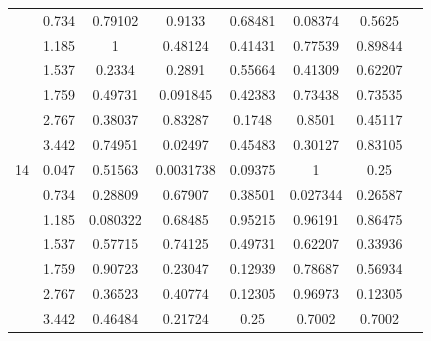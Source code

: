 \begin{table}[H]
\begin{center}
\begin{tabular}{cccccccc}
    &          0.734&          0.79102&          0.9133&          0.68481&          0.08374&          0.5625 \\
    &          1.185&          1&          0.48124&          0.41431&          0.77539&          0.89844 \\
    &          1.537&          0.2334&          0.2891&          0.55664&          0.41309&          0.62207 \\
    &          1.759&          0.49731&          0.091845&          0.42383&          0.73438&          0.73535 \\
    &          2.767&          0.38037&          0.83287&          0.1748&          0.8501&          0.45117 \\
    &          3.442&          0.74951&          0.02497&          0.45483&          0.30127&          0.83105 \\
  14&          0.047&          0.51563&          0.0031738&          0.09375&          1&          0.25 \\
    &          0.734&          0.28809&          0.67907&          0.38501&          0.027344&          0.26587 \\
    &          1.185&          0.080322&          0.68485&          0.95215&          0.96191&          0.86475 \\
    &          1.537&          0.57715&          0.74125&          0.49731&          0.62207&          0.33936 \\
    &          1.759&          0.90723&          0.23047&          0.12939&          0.78687&          0.56934 \\
    &          2.767&          0.36523&          0.40774&          0.12305&          0.96973&          0.12305 \\
    &          3.442&          0.46484&          0.21724&          0.25&          0.7002&          0.7002 \\
      \bottomrule
    \end{tabular}
  \end{center}
\end{table}

